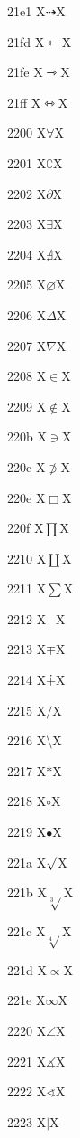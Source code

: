 \documentclass[11pt]{article}
\begin{document}
21e1 X{\ensuremath{\dashrightarrow}}X

21fd X{\ensuremath{\leftarrowtriangle}}X

21fe X{\ensuremath{\rightarrowtriangle}}X

21ff X{\ensuremath{\leftrightarrowtriangle}}X

2200 X{\ensuremath{\forall}}X

2201 X{\ensuremath{\complement}}X

2202 X{\ensuremath{\partial}}X

2203 X{\ensuremath{\exists}}X

2204 X{\ensuremath{\nexists}}X

2205 X{\ensuremath{\varnothing}}X

2206 X{\ensuremath{\Delta}}X

2207 X{\ensuremath{\nabla}}X

2208 X{\ensuremath{\in}}X

2209 X{\ensuremath{\notin}}X

220b X{\ensuremath{\ni}}X

220c X{\ensuremath{\notni}}X

220e X{\ensuremath{\Box}}X

220f X{\ensuremath{\prod}}X

2210 X{\ensuremath{\coprod}}X

2211 X{\ensuremath{\sum}}X

2212 X{\ensuremath{-}}X

2213 X{\ensuremath{\mp}}X

2214 X{\ensuremath{\dotplus}}X

2215 X{\ensuremath{/}}X

2216 X{\ensuremath{\setminus}}X

2217 X{\ensuremath{\ast}}X

2218 X{\ensuremath{\circ}}X

2219 X{\ensuremath{\bullet}}X

221a X{\ensuremath{\surd}}X

221b X{\ensuremath{\sqrt[3]{}}}X

221c X{\ensuremath{\sqrt[4]{}}}X

221d X{\ensuremath{\propto}}X

221e X{\ensuremath{\infty}}X

2220 X{\ensuremath{\angle}}X

2221 X{\ensuremath{\measuredangle}}X

2222 X{\ensuremath{\sphericalangle}}X

2223 X{\ensuremath{\mid}}X
\end{document}
